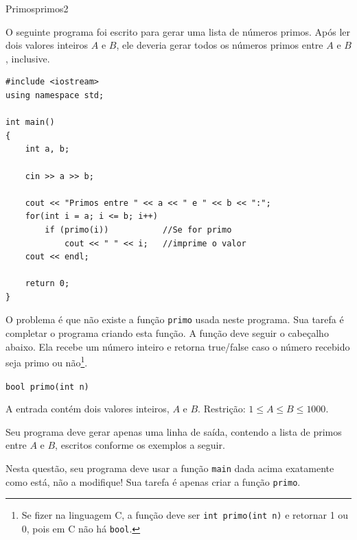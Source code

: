 \documentclass[12pt,a4paper,oneside]{article}
\begin{document}
\begin{problem}{Primos}{primos}{2}
 
O seguinte programa foi escrito para gerar uma lista de números primos. Após ler dois valores inteiros $A$ e $B$, ele deveria gerar todos os números primos entre $A$ e $B$, inclusive.

{\small
\begin{lstlisting}
#include <iostream>
using namespace std;

int main()
{
    int a, b;

    cin >> a >> b;
    
    cout << "Primos entre " << a << " e " << b << ":";
    for(int i = a; i <= b; i++)
        if (primo(i))           //Se for primo
            cout << " " << i;   //imprime o valor
    cout << endl;

    return 0;
}
\end{lstlisting}
}

O problema é que não existe a função \texttt{primo} usada neste programa. Sua tarefa é completar o programa criando esta função. A função deve seguir o cabeçalho abaixo. Ela recebe um número inteiro e retorna true/false caso o número recebido seja primo ou não\footnote{Se fizer na linguagem C, a função deve ser \texttt{int primo(int n)} e retornar 1 ou 0, pois em C não há \texttt{bool}.}.

\texttt{\textcolor{Mulberry}{bool} primo(\textcolor{Mulberry}{int} n)}

%

\InputFile

A entrada contém dois valores inteiros, $A$ e $B$. Restrição: $1 \leq A \leq B \leq 1000$.


\OutputFile

Seu programa deve gerar apenas uma linha de saída, contendo a lista de primos entre $A$ e $B$, escritos conforme os exemplos a seguir.

\Notes
Nesta questão, seu programa deve usar a função \texttt{main} dada acima exatamente como está, não a modifique! Sua tarefa é apenas criar a função \texttt{primo}.

\Example

\begin{example}
%
\end{example}

\begin{example}
%
\end{example}

\begin{example}
%
\end{example}



\end{problem}
\end{document}
